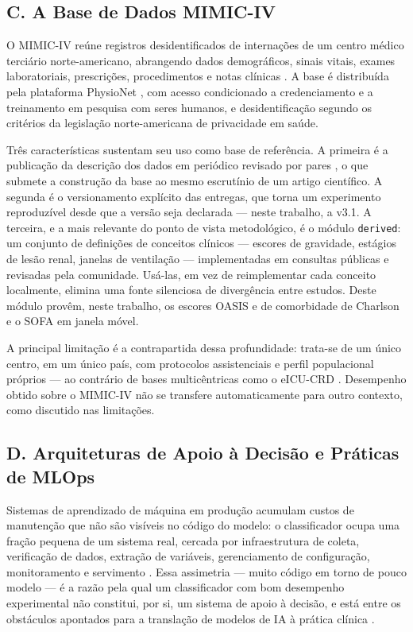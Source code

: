 \documentclass{ieeeaccess}
\begin{document}
\subsection*{C. A Base de Dados MIMIC-IV}
O MIMIC-IV reúne registros desidentificados de internações de um centro médico terciário norte-americano, abrangendo dados demográficos, sinais vitais, exames laboratoriais, prescrições, procedimentos e notas clínicas \cite{Johnson2023}. A base é distribuída pela plataforma PhysioNet \cite{Goldberger2000}, com acesso condicionado a credenciamento e a treinamento em pesquisa com seres humanos, e desidentificação segundo os critérios da legislação norte-americana de privacidade em saúde.

Três características sustentam seu uso como base de referência. A primeira é a publicação da descrição dos dados em periódico revisado por pares \cite{Johnson2023}, o que submete a construção da base ao mesmo escrutínio de um artigo científico. A segunda é o versionamento explícito das entregas, que torna um experimento reproduzível desde que a versão seja declarada --- neste trabalho, a v3.1. A terceira, e a mais relevante do ponto de vista metodológico, é o módulo \texttt{derived}: um conjunto de definições de conceitos clínicos --- escores de gravidade, estágios de lesão renal, janelas de ventilação --- implementadas em consultas públicas e revisadas pela comunidade. Usá-las, em vez de reimplementar cada conceito localmente, elimina uma fonte silenciosa de divergência entre estudos. Deste módulo provêm, neste trabalho, os escores OASIS e de comorbidade de Charlson e o SOFA em janela móvel.

A principal limitação é a contrapartida dessa profundidade: trata-se de um único centro, em um único país, com protocolos assistenciais e perfil populacional próprios --- ao contrário de bases multicêntricas como o eICU-CRD \cite{Pollard2018}. Desempenho obtido sobre o MIMIC-IV não se transfere automaticamente para outro contexto, como discutido nas limitações.

\subsection*{D. Arquiteturas de Apoio à Decisão e Práticas de MLOps}
Sistemas de aprendizado de máquina em produção acumulam custos de manutenção que não são visíveis no código do modelo: o classificador ocupa uma fração pequena de um sistema real, cercada por infraestrutura de coleta, verificação de dados, extração de variáveis, gerenciamento de configuração, monitoramento e servimento \cite{Sculley2015}. Essa assimetria --- muito código em torno de pouco modelo --- é a razão pela qual um classificador com bom desempenho experimental não constitui, por si, um sistema de apoio à decisão, e está entre os obstáculos apontados para a translação de modelos de IA à prática clínica \cite{Kelly2019}.
\end{document}
